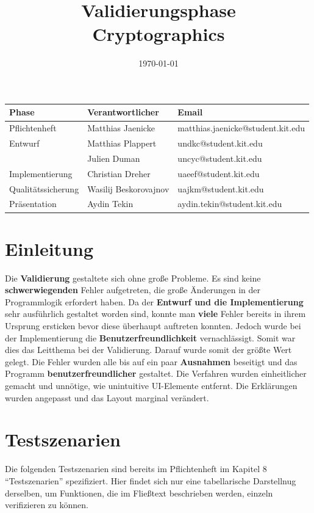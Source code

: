 \documentclass{article}
\title{\textbf{Validierungsphase} \\ Cryptographics}
\author{}
\date{\today}
\begin{document}
\maketitle
\begin{table}[b]
  \begin{tabular}{| l | l | l |}
    \hline
    \textbf{Phase} & \textbf{Verantwortlicher} & \textbf{Email} \\ \hline
    Pflichtenheft & Matthias Jaenicke & matthias.jaenicke@student.kit.edu \\ \hline
    Entwurf & Matthias Plappert & undkc@student.kit.edu \\
            & Julien Duman & uncyc@student.kit.edu \\ \hline
    Implementierung & Christian Dreher & uaeef@student.kit.edu \\ \hline
    Qualitätssicherung & Wasilij Beskorovajnov & uajkm@student.kit.edu \\ \hline
    Präsentation & Aydin Tekin & aydin.tekin@student.kit.edu \\ \hline
    \end{tabular}
\end{table}
\thispagestyle{empty}
\newpage

\tableofcontents
\newpage

\section{Einleitung}
 Die \textbf{Validierung} gestaltete sich ohne große Probleme. Es sind keine \textbf{schwerwiegenden} Fehler aufgetreten, die große Änderungen in der Programmlogik 
 erfordert haben. Da der \textbf{Entwurf und die Implementierung} sehr ausführlich gestaltet worden sind, konnte man \textbf{viele} Fehler bereits in ihrem Ursprung 
 ersticken bevor diese überhaupt auftreten konnten. Jedoch wurde bei der Implementierung die \textbf{Benutzerfreundlichkeit} vernachlässigt. Somit war
 dies das Leitthema bei der Validierung. Darauf wurde somit der größte Wert gelegt.\newline
 Die Fehler wurden alle bis auf ein paar \textbf{Ausnahmen} beseitigt und das Programm \textbf{benutzerfreundlicher} gestaltet. Die Verfahren wurden einheitlicher
 gemacht und unnötige, wie unintuitive UI-Elemente entfernt. Die Erklärungen wurden angepasst und das Layout marginal verändert.
\clearpage

\section{Testszenarien}
  Die folgenden Testszenarien sind bereits im Pflichtenheft im Kapitel 8 ``Testszenarien'' spezifiziert. Hier
  findet sich nur eine tabellarische Darstellnug derselben, um Funktionen, die im Fließtext beschrieben werden,
  einzeln verifizieren zu können.
  
\end{document}
